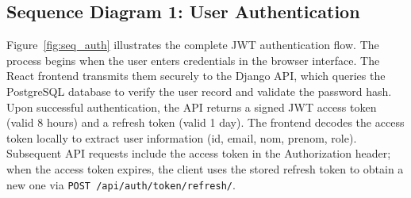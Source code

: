 \documentclass[12pt,a4paper,twoside]{report}
\begin{document}
\subsection{Sequence Diagram 1: User Authentication}

Figure~\ref{fig:seq_auth} illustrates the complete JWT authentication flow. The process begins when the user enters credentials in the browser interface. The React frontend transmits them securely to the Django API, which queries the PostgreSQL database to verify the user record and validate the password hash. Upon successful authentication, the API returns a signed JWT access token (valid 8 hours) and a refresh token (valid 1 day). The frontend decodes the access token locally to extract user information (id, email, nom, prenom, role). Subsequent API requests include the access token in the Authorization header; when the access token expires, the client uses the stored refresh token to obtain a new one via \texttt{POST /api/auth/token/refresh/}.
\end{document}
